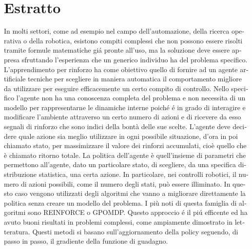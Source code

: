\newcommand{\estrattoname}{Estratto}
\addcontentsline{toc}{chapter}{\estrattoname}

\begingroup
\let\clearpage\relax
\let\cleardoublepage\relax
\let\cleardoublepage\relax

\chapter*{Estratto}
\begin{otherlanguage}{italian}
In molti settori, come ad esempio nel campo dell'automazione, della ricerca operativa o della robotica, esistono compiti complessi che non possono essere risolti tramite formule matematiche gi\'a pronte all'uso, ma la soluzione deve essere appresa sfruttando l'esperienza che un generico individuo ha del problema specifico.\newline
 L'apprendimento per rinforzo ha come obiettivo quello di fornire ad un agente artificiale tecniche per scegliere in maniera automatica il comportamento migliore da utilizzare per eseguire efficacemente un certo compito di controllo. Nello specifico l'agente non ha una conoscenza completa del problema e non necessita di un modello per rappresentarne le dinamiche interne poich\'e \'e in grado di interagire e modificare l'ambiente attraverso un certo numero di azioni e di ricevere da esso segnali di rinforzo che sono indici della bontà delle sue scelte.
L'agente deve decidere quale azione sia meglio utilizzare in ogni possibile situazione, d'ora in poi chiamato stato, per massimizzare il valore dei rinforzi accumulati, cioè quello che è chiamato ritorno totale.
La politica dell'agente è quell'insieme di parametri che permettono all'agente, dato un particolare stato, di scegliere, da una specifica distribuzione statistica, una certa azione.
In particolare, nei controlli robotici, il numero di azioni possibili, come il numero degli stati, può essere illiminato. 
In questo caso vengono utilizzati degli algoritmi che vanno a migliorare direttamente la politica senza creare un modello del problema. I più noti di questa famiglia di algoritmi sono REINFORCE o GPOMDP.
Questo approccio \'e il pi\'u efficente ed ha avuto buoni risultati in problemi complessi, come ampiamente dimostrato in letteratura.
Questi metodi si basano sull'aggiornamento della policy seguendo, di passo in passo, il gradiente della funzione di guadagno.

\end{otherlanguage}
